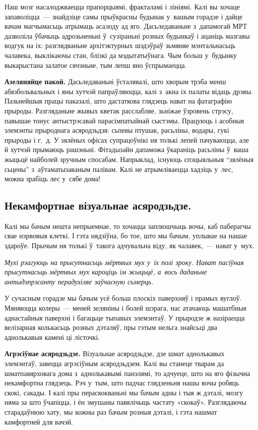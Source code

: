Наш мозг насалоджваецца прапорцыямі, фракталамі і лініямі. Калі вы хочаце запаволіцца~--- знайдзіце самы прыўкрасны будынак у~вашым горадзе і дайце вачам магчымасьць атрымаць асалоду ад яго. Дасьледаваньне з~дапамогай МРТ дазволіла ўбачыць адрозьненьні ў~сузіраньні розных будынкаў і ацаніць мазгавы водгук на іх: разглядваньне архітэктурных шэдэўраў зьмяняе мэнтальнасьць чалавека, выклікаючы стан, блізкі да мэдытатыўнага. Чым больш у~будынку выкарыстана залатое сячэньне, тым лепш яно ўспрымаецца.

\textbf{Азеляняйце пакой.} Дасьледаваньні ўсталявалі, што хворым трэба менш абязбольвальных і яны хутчэй папраўляюцца, калі з~акна іх палаты відаць дрэвы. Пазьнейшыя працы паказалі, што дастаткова глядзець нават на фатаграфію прыроды. Разгляданьне жывых кветак расслабляе, зьніжае ўзровень стрэсу, павышае тонус антыстрэсавай парасімпатыйнай сыстэмы. Працуюць і асобныя элемэнты прыроднага асяродзьдзя: сьпевы птушак, расьліны, водары, гукі прыроды і г.~д. У зялёных офісах супрацоўнікі ня толькі лепей пачуваюцца, але й хутчэй прымаюць рашэньні. Фітадызайн дапаможа ўкараніць расьліны ў~ваша жыцьцё найболей зручным спосабам. Напрыклад, існуюць спэцыяльныя ``зялёныя сьцены'' з~аўтаматызаваным палівам. Калі не атрымліваецца хадзіць у~лес, можна зрабіць лес у~сябе дома!

\subsection*{Некамфортнае візуальнае асяродзьдзе.}

Калі мы бачым нешта непрыемнае, то хочацца заплюшчыць вочы, каб паберагчы свае нэрвовыя клеткі. І гэта нядзіўна, бо тое, што мы бачым, уплывае на нашае здароўе. Прычым ня толькі ў~такога адчувальна віду, як чалавек,~--- нават у~мух.

\emph{Мухі рэагуюць на прысутнасьць мёртвых мух у~іх полі зроку. Нават пасіўная прысутнасьць мёртвых мух кароціць ім жыцьцё, а~вось даданьне антыдэпрэсанту перадухіляе заўчасную сьмерць.}

У сучасным горадзе мы бачым усё больш плоскіх паверхняў і прамых вуглоў. Мяняюцца колеры~--- меней зеляніны і болей шэрага, нас атачаюць машатбныя аднастайныя паверхні і багацьце тыпавых элемэнтаў. У прыродзе ж назіраецца велізарная колькасьць розных дэталяў, пры гэтым нельга знайсьці два аднолькавыя камені ці лісточкі.

\textbf{Агрэсіўнае асяродзьдзе.} Візуальнае асяродзьдзе, дзе шмат аднолькавых элемэнтаў, завецца агрэсіўным асяродзьдзем. Калі вы станеце тварам да шматпавярховага дома з~аднолькавымі панэлямі, то адчуеце, што на яго фізычна некамфортна глядзець. Рэч у~тым, што падчас глядзеньня нашы вочы робяць скокі, сакады. І калі пры пераскокваньні мы бачым адны і тыя ж дэталі, мозгу няма за што ўчапіцца, і ён змушаны павялічыць частату «скокаў». Разглядаючы старадаўнюю хату, мы кожны раз бачым розныя дэталі, і гэта нашмат камфортней для вачэй. 

